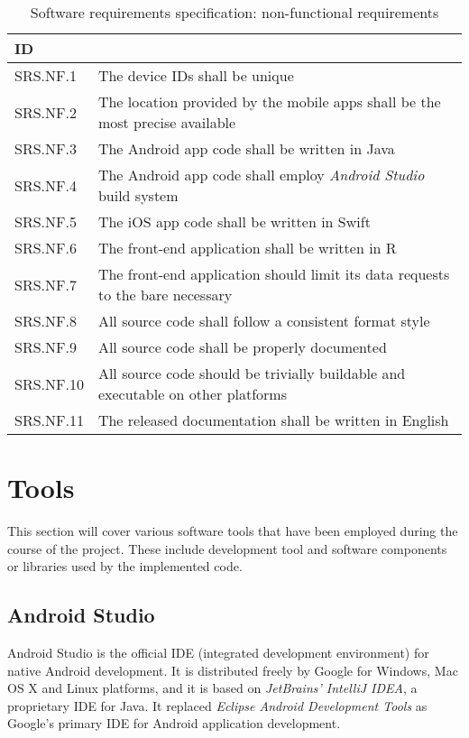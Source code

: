 \begin{table}[H]
\centerfloat
\begin{tabular}{@{} m{4em} >{\small}l @{}}
	\toprule
	ID			& \normalfont{Description} \\
	\midrule
	SRS.NF.1	& The device IDs shall be unique \\
	SRS.NF.2	& The location provided by the mobile apps shall be the most precise available \\
	SRS.NF.3	& The Android app code shall be written in Java \\
	SRS.NF.4	& The Android app code shall employ \emph{Android Studio} build system \\
	SRS.NF.5	& The iOS app code shall be written in Swift \\
	SRS.NF.6	& The front-end application shall be written in R \\
	SRS.NF.7	& The front-end application should limit its data requests to the bare necessary \\
	SRS.NF.8	& All source code shall follow a consistent format style \\
	SRS.NF.9	& All source code shall be properly documented \\
	SRS.NF.10	& All source code should be trivially buildable and executable on other platforms \\
	SRS.NF.11	& The released documentation shall be written in English \\
	\bottomrule
\end{tabular}
\caption{{\footnotesize Software requirements specification: non-functional requirements}}
\end{table}


\section{Tools}
This section will cover various software tools that have been employed during the course of the project.
These include development tool and software components or libraries used by the implemented code.


\subsection{Android Studio}
Android Studio is the official IDE (integrated development environment) for native Android development.
It is distributed freely by Google for Windows, Mac OS X and Linux platforms, and it is based on \emph{JetBrains' IntelliJ IDEA}, a proprietary IDE for Java.
It replaced \emph{Eclipse Android Development Tools} as Google's primary IDE for Android application development.

